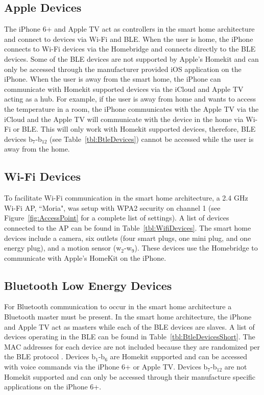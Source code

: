\documentclass[12pt,letterpaper,oneside]{book}
\begin{document}
			\subsection{Apple Devices}
			
			The iPhone 6+ and Apple TV act as controllers in the smart home architecture and connect to devices via Wi-Fi and \ac{BLE}. When the user is home, the iPhone connects to Wi-Fi devices via the Homebridge and connects directly to the \ac{BLE} devices. Some of the \ac{BLE} devices are not supported by Apple's Homekit and can only be accessed through the manufacturer provided iOS application on the iPhone. When the user is away from the smart home, the iPhone can communicate with Homekit supported devices via the iCloud and Apple TV acting as a hub. For example, if the user is away from home and wants to access the temperature in a room, the iPhone communicates with the Apple TV via the iCloud and the Apple TV will communicate with the device in the home via Wi-Fi or \ac{BLE}. This will only work with Homekit supported devices, therefore, \ac{BLE} devices b$ _7 $-b$ _{12} $ (see Table~\ref{tbl:BtleDevices}) cannot be accessed while the user is away from the home.
			
			\subsection{Wi-Fi Devices}
			
			To facilitate Wi-Fi communication in the smart home architecture, a 2.4 GHz Wi-Fi \ac{AP}, ``Moria", was setup with WPA2 security on channel 1 (see Figure~\ref{fig:AccessPoint} for a complete list of settings). A list of devices connected to the \ac{AP} can be found in Table~\ref{tbl:WifiDevices}. The smart home devices include a camera, six outlets (four smart plugs, one mini plug, and one energy plug), and a motion sensor (w$ _2 $-w$ _9 $). These devices use the Homebridge to communicate with Apple's HomeKit on the iPhone. 
			
			\figAccessPoint
			
			\tableWifiDevices
			
			\subsection{Bluetooth Low Energy Devices}
			
			For Bluetooth communication to occur in the smart home architecture a Bluetooth master must be present. In the smart home architecture, the iPhone and Apple TV act as masters while each of the \ac{BLE} devices are slaves. A list of devices operating in the \ac{BLE} can be found in Table~\ref{tbl:BtleDevicesShort}. The \ac{MAC} addresses for each device are not included because they are randomized per the \ac{BLE} protocol \cite{sig4.2}. Devices b$ _1 $-b$ _6 $ are Homekit supported and can be accessed with voice commands via the iPhone 6+ or Apple TV. Devices b$ _7 $-b$ _{12} $ are not Homekit supported and can only be accessed through their manufacture specific applications on the iPhone 6+.
			
\end{document}
